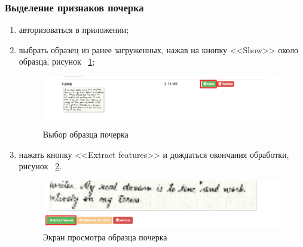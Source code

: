 \subsubsection{Выделение признаков почерка}
\label{sec:manpage:client_man:features}
\begin{enumerate}
    \item авторизоваться в приложении;
    \item выбрать образец из ранее загруженных, нажав на кнопку <<Show>> около образца, рисунок ~\ref{fig:manpage:client_man:show_button};
        \begin{figure}[ht]
            \centering
            \includegraphics[width=0.6\textheight]{figures/samples_open.png}
            \caption{Выбор образца почерка}
            \label{fig:manpage:client_man:show_button}
        \end{figure}
    \item нажать кнопку <<Extract features>> и дождаться окончания обработки, рисунок ~\ref{fig:manpage:client_man:extract_features}.
        \begin{figure}[ht]
            \centering
            \includegraphics[width=0.6\textheight]{figures/extract_features.png}
            \caption{Экран просмотра образца почерка}
            \label{fig:manpage:client_man:extract_features}
        \end{figure}
\end{enumerate}


